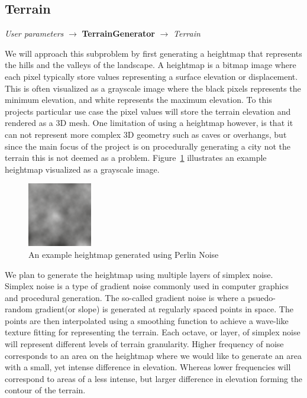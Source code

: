 \subsection{Terrain}
\begin{center}
  \textit{User parameters} $\rightarrow$ \textbf{TerrainGenerator}  $\rightarrow$ \textit{Terrain}
\end{center}

We will approach this subproblem by first generating a heightmap that represents the hills and the valleys of the landscape.
A heightmap is a bitmap image where each pixel typically store values representing a surface elevation or displacement.
This is often visualized as a grayscale image where the black pixels represents the minimum elevation, and white represents the maximum elevation.
To this projects particular use case the pixel values will store the terrain elevation and rendered as a 3D mesh.
One limitation of using a heightmap however, is that it can not represent more complex 3D geometry such as caves or overhangs, but since the main focus of the project is on procedurally generating a city not the terrain this is not deemed as a problem.
Figure~\ref{fig:heightmap} illustrates an example heightmap visualized as a grayscale image.

\begin{figure}[h]
  \centering
  \includegraphics[width=0.25\textwidth]{figure/heightmap.png}
  \caption{An example heightmap generated using Perlin Noise}
  \label{fig:heightmap}
\end{figure}

We plan to generate the heightmap using multiple layers of simplex noise.
Simplex noise is a type of gradient noise commonly used in computer graphics and procedural generation.
The so-called gradient noise is where a psuedo-random gradient(or slope) is generated at regularly spaced points in space.
The points are then interpolated using a smoothing function to achieve a wave-like texture fitting for representing the terrain.
Each octave, or layer, of simplex noise will represent different levels of terrain granularity.
Higher frequency of noise corresponds to an area on the heightmap where we would like to generate an area with a small, yet intense difference in elevation.
Whereas lower frequencies will correspond to areas of a less intense, but larger difference in elevation forming the contour of the terrain.

